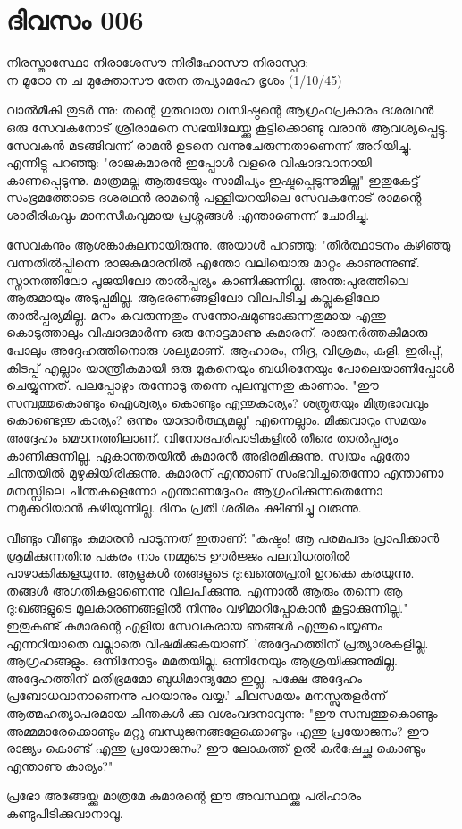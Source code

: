  
\section{ദിവസം 006}

\begin{center}
നിരസ്താസ്ഥോ നിരാശേസൗ നിരീഹോസൗ നിരാസ്പദ:\\
ന മൂഠോ ന ച മുക്തോസൗ തേന തപ്യാമഹേ ഭൃശം (1/10/45)\\
\end{center}

വാല്‍മീകി തുടര്‍ ന്നു: തന്റെ ഗുരുവായ വസിഷ്ഠന്റെ ആഗ്രഹപ്രകാരം ദശരഥന്‍ ഒരു സേവകനോട്‌ ശ്രീരാമനെ സഭയിലേയ്ക്കു കൂട്ടിക്കൊണ്ടു വരാന്‍ ആവശ്യപ്പെട്ടു. സേവകന്‍ മടങ്ങിവന്ന് രാമന്‍ ഉടനെ വന്നുചേരുന്നതാണെന്ന് അറിയിച്ചു. എന്നിട്ടു പറഞ്ഞു: "രാജകുമാരന്‍ ഇപ്പോള്‍ വളരെ വിഷാദവാനായി കാണപ്പെടുന്നു. മാത്രമല്ല ആരുടേയും സാമീപ്യം ഇഷ്ടപ്പെടുന്നുമില്ല" ഇതുകേട്ട്‌ സംഭ്രമത്തോടെ ദശരഥന്‍ രാമന്റെ പള്ളിയറയിലെ സേവകനോട്‌ രാമന്റെ ശാരീരികവും മാനസീകവുമായ പ്രശ്നങ്ങള്‍ എന്താണെന്ന് ചോദിച്ചു. 


സേവകനും ആശങ്കാകുലനായിരുന്നു. അയാള്‍ പറഞ്ഞു: "തീര്‍ത്ഥാടനം കഴിഞ്ഞു വന്നതില്‍പ്പിന്നെ രാജകുമാരനില്‍ എന്തോ വലിയൊരു മാറ്റം കാണുന്നുണ്ട്‌. സ്നാനത്തിലോ പൂജയിലോ താല്‍പ്പര്യം കാണിക്കുന്നില്ല. അന്ത:പുരത്തിലെ ആരുമായും അടുപ്പമില്ല. ആഭരണങ്ങളിലോ വിലപിടിച്ച കല്ലുകളിലോ താല്‍പ്പര്യമില്ല. മനം കവരുന്നതും സന്തോഷമുണ്ടാക്കുന്നതുമായ എന്തു കൊടുത്താലും വിഷാദമാര്‍ന്ന ഒരു നോട്ടമാണു കുമാരന്‌. രാജനര്‍ത്തകിമാരു പോലും അദ്ദേഹത്തിനൊരു ശല്യമാണ്‌. ആഹാരം, നിദ്ര, വിശ്രമം, കുളി, ഇരിപ്പ്‌, കിടപ്പ്‌ എല്ലാം യാന്ത്രീകമായി ഒരു മൂകനെയും ബധിരനേയും പോലെയാണിപ്പോള്‍ ചെയ്യുന്നത്‌. പലപ്പോഴും തന്നോടു തന്നെ പുലമ്പുന്നതു കാണാം. "ഈ സമ്പത്തുകൊണ്ടും ഐശ്വര്യം കൊണ്ടും എന്തുകാര്യം? ശത്രുതയും മിത്രഭാവവും കൊണ്ടെന്തു കാര്യം? ഒന്നും യാദാര്‍ത്ഥ്യമല്ല" എന്നെല്ലാം. മിക്കവാറും സമയം അദ്ദേഹം മൌനത്തിലാണ്‌. വിനോദപരിപാടികളില്‍ തീരെ താല്‍പ്പര്യം കാണിക്കുന്നില്ല. ഏകാന്തതയില്‍ കുമാരന്‍ അഭിരമിക്കുന്നു. സ്വയം ഏതോ ചിന്തയില്‍ മുഴുകിയിരിക്കുന്നു. കുമാരന്‌ എന്താണ്‌ സംഭവിച്ചതെന്നോ എന്താണാ മനസ്സിലെ ചിന്തകളെന്നോ എന്താണദ്ദേഹം ആഗ്രഹിക്കുന്നതെന്നോ നമുക്കറിയാന്‍ കഴിയുന്നില്ല. ദിനം പ്രതി ശരീരം ക്ഷീണിച്ചു വരുന്നു. 

വീണ്ടും വീണ്ടും കുമാരന്‍ പാടുന്നത്‌ ഇതാണ്‌: "കഷ്ടം! ആ പരമപദം പ്രാപിക്കാന്‍ ശ്രമിക്കുന്നതിനു പകരം നാം നമ്മുടെ ഊര്‍ജ്ജം പലവിധത്തില്‍ പാഴാക്കിക്കളയുന്നു. ആളുകള്‍ തങ്ങളുടെ ദു:ഖത്തെപ്രതി ഉറക്കെ കരയുന്നു. തങ്ങള്‍ അഗതികളാണെന്നു വിലപിക്കുന്നു. എന്നാല്‍ ആരും തന്നെ ആ ദു:ഖങ്ങളുടെ മൂലകാരണങ്ങളില്‍ നിന്നും വഴിമാറിപ്പോകാന്‍ കൂട്ടാക്കുന്നില്ല." ഇതുകണ്ട്‌ കുമാരന്റെ എളിയ സേവകരായ ഞങ്ങള്‍ എന്തുചെയ്യണം എന്നറിയാതെ വല്ലാതെ വിഷമിക്കുകയാണ്‌. 'അദ്ദേഹത്തിന്‌ പ്രത്യാശകളില്ല. ആഗ്രഹങ്ങളും. ഒന്നിനോടും മമതയില്ല. ഒന്നിനേയും ആശ്രയിക്കുന്നുമില്ല. അദ്ദേഹത്തിന്‌ മതിഭ്രമമോ ബുധിമാന്ദ്യമോ ഇല്ല. പക്ഷേ അദ്ദേഹം പ്രബോധവാനാണെന്നു പറയാനും വയ്യ.' ചിലസമയം മനസ്സുതളര്‍ന്ന് ആത്മഹത്യാപരമായ ചിന്തകള്‍ ക്കു വശംവദനാവുന്നു: "ഈ സമ്പത്തുകൊണ്ടും അമ്മമാരേക്കൊണ്ടും മറ്റു ബന്ധുജനങ്ങളേക്കൊണ്ടും എന്തു പ്രയോജനം? ഈ രാജ്യം കൊണ്ട്‌ എന്തു പ്രയോജനം? ഈ ലോകത്ത്‌ ഉല്‍ കര്‍ഷേച്ഛ കൊണ്ടും എന്താണു കാര്യം?" 


പ്രഭോ അങ്ങേയ്ക്കു മാത്രമേ കുമാരന്റെ ഈ അവസ്ഥയ്ക്കു പരിഹാരം കണ്ടുപിടിക്കുവാനാവൂ.
